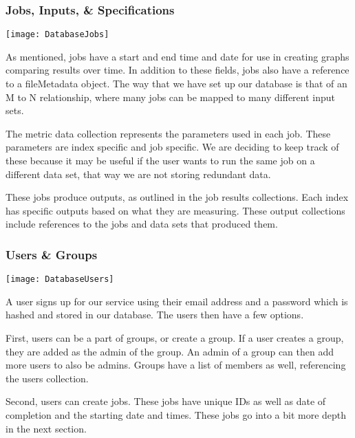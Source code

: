 \subsubsection{Jobs, Inputs, \& Specifications}
\begin{center}
  \texttt{[image: DatabaseJobs]} \\[12pt]
\end{center}
As mentioned, jobs have a start and end time and date for use in creating graphs comparing results over time. In addition to these fields, jobs also have a reference to a fileMetadata object. The way that we have set up our database is that of an M to N relationship, where many jobs can be mapped to many different input sets.\par
The metric data collection represents the parameters used in each job. These parameters are index specific and job specific. We are deciding to keep track of these because it may be useful if the user wants to run the same job on a different data set, that way we are not storing redundant data.\par
These jobs produce outputs, as outlined in the job results collections. Each index has specific outputs based on what they are measuring. These output collections include references to the jobs and data sets that produced them.\par

\subsubsection{Users \& Groups}
\begin{center}
  \texttt{[image: DatabaseUsers]} \\[12pt]
\end{center}
A user signs up for our service using their email address and a password which is hashed and stored in our database. The users then have a few options.\par
First, users can be a part of groups, or create a group. If a user creates a group, they are added as the admin of the group. An admin of a group can then add more users to also be admins. Groups have a list of members as well, referencing the users collection.\par
Second, users can create jobs. These jobs have unique IDs as well as date of completion and the starting date and times. These jobs go into a bit more depth in the next section.
